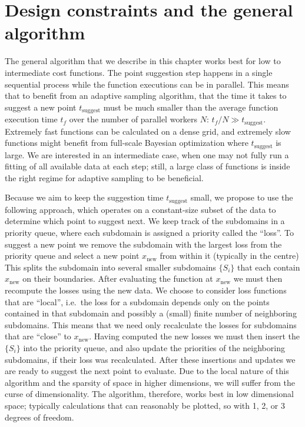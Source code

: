 \section{Design constraints and the general algorithm}


The general algorithm that we describe in this chapter works best for low to intermediate cost functions.
The point suggestion step happens in a single sequential process while the function executions can be in parallel.
This means that to benefit from an adaptive sampling algorithm, that the time it takes to suggest a new point $t_\textrm{suggest}$ must be much smaller than the average function execution time $t_f$ over the number of parallel workers $N$: $t_f / N \gg t_\textrm{suggest}$.
Extremely fast functions can be calculated on a dense grid, and extremely slow functions might benefit from full-scale Bayesian optimization where $t_\textrm{suggest}$ is large.
We are interested in an intermediate case, when one may not fully run a fitting of all available data at each step; still, a large class of functions is inside the right regime for adaptive sampling to be beneficial.


Because we aim to keep the suggestion time $t_\textrm{suggest}$ small, we propose to use the following approach, which operates on a constant-size subset of the data to determine which point to suggest next.
We keep track of the subdomains in a priority queue, where each subdomain is assigned a priority called the ``loss''.
To suggest a new point we remove the subdomain with the largest loss from the priority queue and select a new point $x_\textrm{new}$ from within it (typically in the centre)
This splits the subdomain into several smaller subdomains $\{S_i\}$ that each contain $x_\textrm{new}$ on their boundaries.
After evaluating the function at $x_\textrm{new}$ we must then recompute the losses using the new data.
We choose to consider loss functions that are ``local'', i.e.~the loss for a subdomain depends only on the points contained in that subdomain and possibly a (small) finite number of neighboring subdomains.
This means that we need only recalculate the losses for subdomains that are ``close'' to $x_\textrm{new}$.
Having computed the new losses we must then insert the $\{S_i\}$ into the priority queue, and also update the priorities of the neighboring subdomains, if their loss was recalculated.
After these insertions and updates we are ready to suggest the next point to evaluate.
Due to the local nature of this algorithm and the sparsity of space in higher dimensions, we will suffer from the curse of dimensionality.
The algorithm, therefore, works best in low dimensional space; typically calculations that can reasonably be plotted, so with 1, 2, or 3 degrees of freedom.


